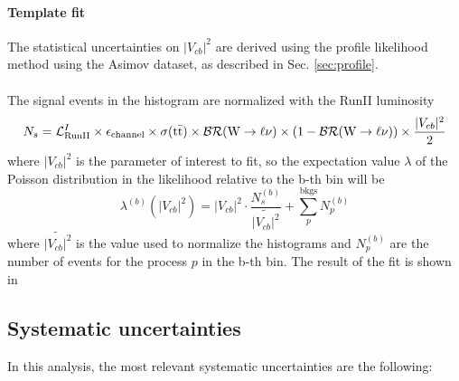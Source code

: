 \paragraph*{Template fit}
The statistical uncertainties on $|V_{cb}|^2$ are derived using the profile likelihood method using the Asimov dataset, as described in Sec. \ref{sec:profile}.\\
\\
The signal events in the histogram are normalized with the RunII luminosity
\begin{equation*}
    N_s=\mathcal{L}_{\text{RunII}}^I \times \epsilon_{\text{channel}}\times \sigma({{\text{t}}{\bar{\text{t}}}})\times \mathcal{BR}({\text{W}} \to \ell \nu)\times (1-\mathcal{BR}({\text{W}} \to \ell \nu)) \times \frac{|V_{cb}|^2}{2}
\end{equation*}
where $|V_{cb}|^2$ is the parameter of interest to fit, so the expectation value $\lambda$ of the Poisson distribution in the likelihood relative to the b-th bin will be
\begin{equation*}
    \lambda^{(b)}(|V_{cb}|^2) = |V_{cb}|^2 \cdot \dfrac{N_s^{(b)}}{\widetilde{|V_{cb}|^2}}+\sum_p^{\text{bkgs}} N_p^{(b)}
\end{equation*}
where $\widetilde{|V_{cb}|^2}$ is the value used to normalize the histograms and $N_p^{(b)}$ are the number of events for the process $p$ in the b-th bin.
The result of the fit is shown in 


\subsection{Systematic uncertainties}

In this analysis, the most relevant systematic uncertainties are the following:

